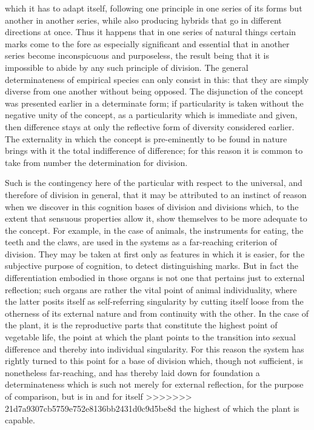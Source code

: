 which it has to adapt itself,
following one principle in one series of its
forms but another in another series,
while also producing hybrids that go
in different directions at once.
Thus it happens that in one series of natural
things certain marks come to the fore
as especially significant and essential
that in another series become inconspicuous and purposeless,
the result being that it is impossible to abide
by any such principle of division.
The general determinateness of empirical species
can only consist in this:
that they are simply diverse from one another
without being opposed.
The disjunction of the concept was
presented earlier in a determinate form;
if particularity is taken without
the negative unity of the concept,
as a particularity which is immediate and given,
then difference stays at only the reflective form of
diversity considered earlier.
The externality in which the concept is
pre-eminently to be found in nature
brings with it the total indifference of difference;
for this reason it is common to take from number
the determination for division.

Such is the contingency here of the particular
with respect to the universal,
and therefore of division in general,
that it may be attributed to an instinct of reason
when we discover in this cognition
bases of division and divisions which,
to the extent that sensuous properties allow it,
show themselves to be more adequate to the concept.
For example, in the case of animals,
the instruments for eating,
the teeth and the claws,
are used in the systems as
a far-reaching criterion of division.
They may be taken at first only as
features in which it is easier,
for the subjective purpose of cognition,
to detect distinguishing marks.
But in fact the differentiation
embodied in those organs is not one
that pertains just to external reflection;
such organs are rather
the vital point of animal individuality,
where the latter posits itself as
self-referring singularity
by cutting itself loose from
the otherness of its external nature
and from continuity with the other.
In the case of the plant,
it is the reproductive parts
that constitute the highest point of vegetable life,
the point at which the plant points to
the transition into sexual difference
and thereby into individual singularity.
For this reason the system has rightly turned to
this point for a base of division
which, though not sufficient,
is nonetheless far-reaching,
and has thereby laid down
for foundation a determinateness
which is such not merely
for external reflection,
for the purpose of comparison,
but is in and for itself
>>>>>>> 21d7a9307cb5759e752e8136bb2431d0c9d5be8d
the highest of which the plant is capable.

